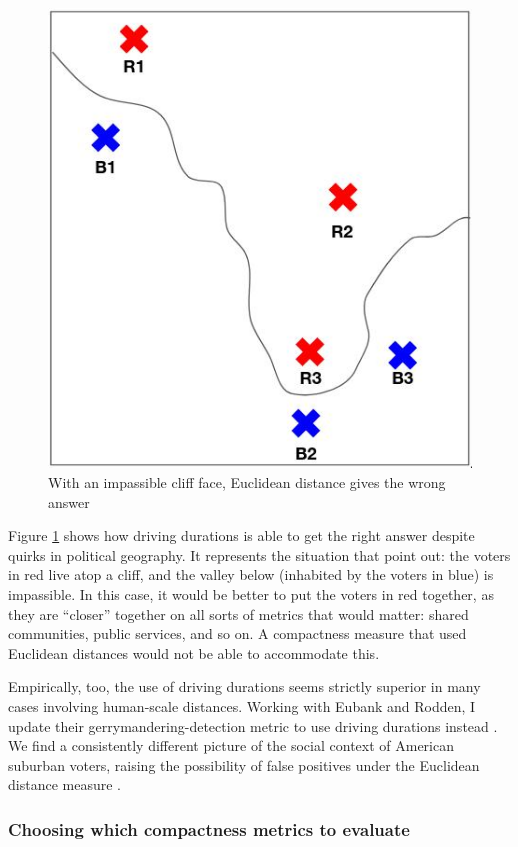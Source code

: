 \documentclass[]{article}
\begin{document}
\begin{figure}
\centering
\includegraphics{./img/hc_impassable.jpg}
\caption{With an impassible cliff face, Euclidean distance gives the
wrong answer \label{hc_impassible}}
\end{figure}

Figure \ref{hc_impassible} shows how driving durations is able to get
the right answer despite quirks in political geography. It represents
the situation that \cite{fh2011} point out: the voters in red live atop
a cliff, and the valley below (inhabited by the voters in blue) is
impassible. In this case, it would be better to put the voters in red
together, as they are ``closer'' together on all sorts of metrics that
would matter: shared communities, public services, and so on. A
compactness measure that used Euclidean distances would not be able to
accommodate this.

Empirically, too, the use of driving durations seems strictly superior
in many cases involving human-scale distances. Working with Eubank and
Rodden, I update their gerrymandering-detection metric to use driving
durations instead \citep{er2019}. We find a consistently different
picture of the social context of American suburban voters, raising the
possibility of false positives under the Euclidean distance measure
\citep*{elrwp}.

\hypertarget{choosing-which-compactness-metrics-to-evaluate}{%
\subsubsection{Choosing which compactness metrics to
evaluate}\label{choosing-which-compactness-metrics-to-evaluate}}
\end{document}
